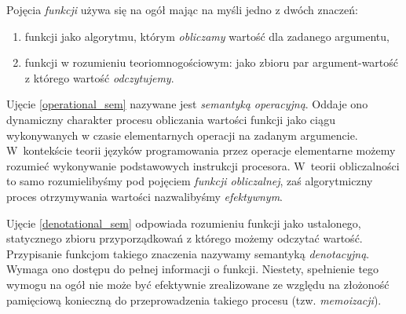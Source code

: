 Pojęcia \emph{funkcji} używa się na ogół mając na myśli jedno z dwóch znaczeń:
\begin{enumerate}[label=(\arabic*)]
  \setlength\itemsep{0em}
  \item funkcji jako algorytmu, którym \emph{obliczamy} wartość dla zadanego argumentu,\label{operational_sem}
  \item funkcji w rozumieniu teoriomnogościowym: jako zbioru par ar\-gu\-ment-wartość z którego wartość \emph{odczytujemy}.
\label{denotational_sem}
\end{enumerate}
Ujęcie \ref{operational_sem} nazywane jest \emph{semantyką operacyjną}. Oddaje ono dynamiczny charakter procesu obliczania wartości funkcji jako ciągu wykonywanych w czasie elementarnych operacji na zadanym argumencie. W~kontekście teorii języków programowania przez operacje elementarne możemy rozumieć wykonywanie podstawowych instrukcji procesora. W~teorii obliczalności to samo rozumielibyśmy pod pojęciem \emph{funkcji obliczalnej}, zaś algorytmiczny proces otrzymywania wartości nazwalibyśmy \emph{efektywnym}.

Ujęcie \ref{denotational_sem} odpowiada rozumieniu funkcji jako ustalonego, statycznego zbioru przyporządkowań z którego możemy odczytać wartość. Przypisanie funkcjom takiego znaczenia nazywamy semantyką \emph{denotacyjną}. Wymaga ono dostępu do pełnej informacji o funkcji. Niestety, spełnienie tego wymogu na ogół nie może być efektywnie zrealizowane ze względu na złożoność pamięciową konieczną do przeprowadzenia takiego procesu (tzw. \emph{memoizacji}).
